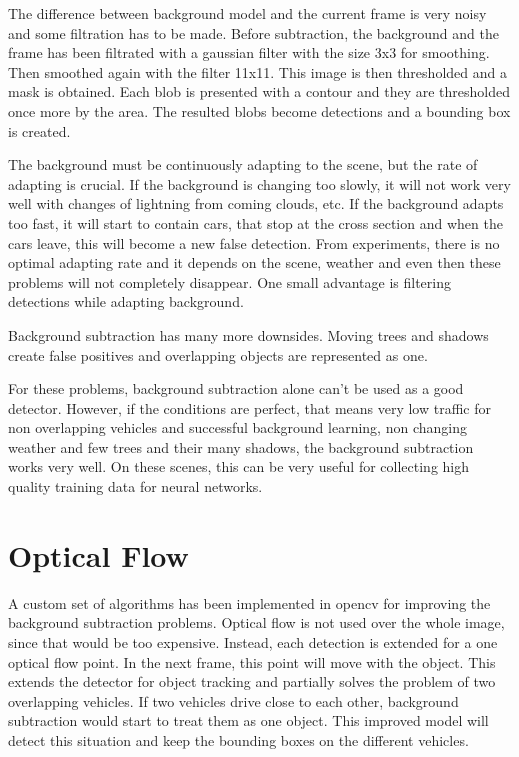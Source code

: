 \documentclass[a4paper,12pt,titlepage, twoside]{article}
\numberwithin{figure}{section}
\begin{document}
The difference between background model and the current frame is very noisy and some filtration has to be made. Before subtraction, the background and the frame has been filtrated with a gaussian filter with the size 3x3 for smoothing. Then smoothed again with the filter 11x11. This image is then thresholded and a mask is obtained. Each blob is presented with a contour and they are thresholded once more by the area. The resulted blobs become detections and a bounding box is created.

The background must be continuously adapting to the scene, but the rate of adapting is crucial. If the background is changing too slowly, it will not work very well with changes of lightning from coming clouds, etc. If the background adapts too fast, it will start to contain cars, that stop at the cross section and when the cars leave, this will become a new false detection. From experiments, there is no optimal adapting rate and it depends on the scene, weather and even then these problems will not completely disappear. One small advantage is filtering detections while adapting background.

Background subtraction has many more downsides. Moving trees and shadows create false positives and overlapping objects are represented as one. 

For these problems, background subtraction alone can't be used as a good detector. However, if the conditions are perfect, that means very low traffic for non overlapping vehicles and successful background learning, non changing weather and few trees and their many shadows, the background subtraction works very well. On these scenes, this can be very useful for collecting high quality training data for neural networks. 

\section{Optical Flow}
A custom set of algorithms has been implemented in opencv\cite{opencv} for improving the background subtraction problems.  Optical flow \cite{optical-flow} is not used over the whole image, since that would be too expensive. Instead, each detection is extended for a one optical flow point. In the next frame, this point will move with the object. This extends the detector for object tracking and partially solves the problem of two overlapping vehicles. If two vehicles drive close to each other, background subtraction would start to treat them as one object. This improved model will detect this situation and keep the bounding boxes on the different vehicles. 
\end{document}
